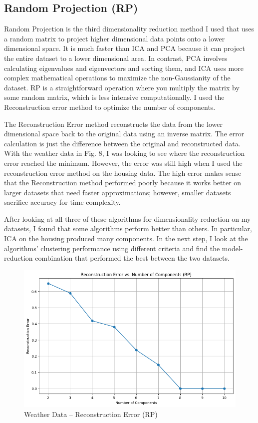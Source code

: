 \documentclass[conference]{IEEEtran}
\begin{document}
\subsection{Random Projection (RP)} 
\par Random Projection is the third dimensionality reduction method I used that uses a random matrix to project higher dimensional data points onto a lower dimensional space. It is much faster than ICA and PCA because it can project the entire dataset to a lower dimensional area. In contrast, PCA involves calculating eigenvalues and eigenvectors and sorting them, and ICA uses more complex mathematical operations to maximize the non-Gaussianity of the dataset. RP is a straightforward operation where you multiply the matrix by some random matrix, which is less intensive computationally. I used the Reconstruction error method to optimize the number of components. 
\par The Reconstruction Error method reconstructs the data from the lower dimensional space back to the original data using an inverse matrix. The error calculation is just the difference between the original and reconstructed data. With the weather data in Fig. 8, I was looking to see where the reconstruction error reached the minimum. However, the error was still high when I used the reconstruction error method on the housing data. The high error makes sense that the Reconstruction method performed poorly because it works better on larger datasets that need faster approximations; however, smaller datasets sacrifice accuracy for time complexity.
\par After looking at all three of these algorithms for dimensionality reduction on my datasets, I found that some algorithms perform better than others. In particular, ICA on the housing produced many components. In the next step, I look at the algorithms' clustering performance using different criteria and find the model-reduction combination that performed the best between the two datasets.
\begin{figure}
    \centering
    \includegraphics[width=0.9\linewidth]{figures//weather_figures/step_2d.png}

        \caption{Weather Data -- Reconstruction Error (RP)}
    \label{fig:8_weather_reconstruction
}
\end{figure}
\end{document}
